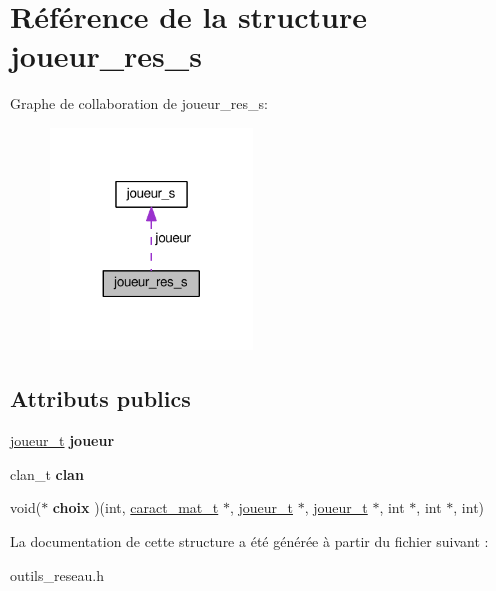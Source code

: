 \hypertarget{structjoueur__res__s}{}\section{Référence de la structure joueur\+\_\+res\+\_\+s}
\label{structjoueur__res__s}


Graphe de collaboration de joueur\+\_\+res\+\_\+s\+:
\nopagebreak
\begin{figure}[H]
\begin{center}
\leavevmode
\includegraphics[width=152pt]{structjoueur__res__s__coll__graph}
\end{center}
\end{figure}
\subsection*{Attributs publics}
\begin{DoxyCompactItemize}
\item 
\hyperlink{structjoueur__s}{joueur\+\_\+t} {\bfseries joueur}\hypertarget{structjoueur__res__s_a520ec40ceaa60a5fe97ce666dbf5d12f}{}\label{structjoueur__res__s_a520ec40ceaa60a5fe97ce666dbf5d12f}

\item 
clan\+\_\+t {\bfseries clan}\hypertarget{structjoueur__res__s_aebdf880186d29b4526684717af4d80d7}{}\label{structjoueur__res__s_aebdf880186d29b4526684717af4d80d7}

\item 
void($\ast$ {\bfseries choix} )(int, \hyperlink{structcaract__mat__t}{caract\+\_\+mat\+\_\+t} $\ast$, \hyperlink{structjoueur__s}{joueur\+\_\+t} $\ast$, \hyperlink{structjoueur__s}{joueur\+\_\+t} $\ast$, int $\ast$, int $\ast$, int)\hypertarget{structjoueur__res__s_a661c177b115a4bcf235de78586cfbdbe}{}\label{structjoueur__res__s_a661c177b115a4bcf235de78586cfbdbe}

\end{DoxyCompactItemize}


La documentation de cette structure a été générée à partir du fichier suivant \+:\begin{DoxyCompactItemize}
\item 
outils\+\_\+reseau.\+h\end{DoxyCompactItemize}
